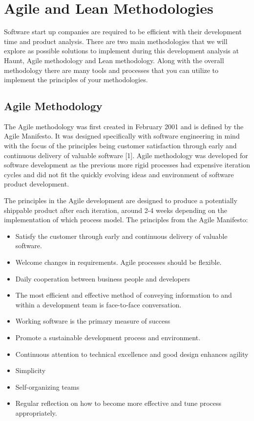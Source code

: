 \chapter{Agile and Lean Methodologies}

Software start up companies are required to be efficient with their development time and product analysis. There are two main methodologies that we will explore as possible solutions to implement during this development analysis at Haunt, Agile methodology and Lean methodology. Along with the overall methodology there are many tools and processes that you can utilize to implement the principles of your methodologies.

\section{Agile Methodology}
The Agile methodology was first created in February 2001 and is defined by the Agile Manifesto. It was designed specifically with software engineering in mind with the focus of the principles being customer satisfaction through early and continuous delivery of valuable software [1]. Agile methodology was developed for software development as the previous more rigid processes had expensive iteration cycles and did not fit the quickly evolving ideas and environment of software product development.

The principles in the Agile development are designed to produce a potentially shippable
product after each iteration, around 2-4 weeks depending on the implementation of which
process model. The principles from the Agile Manifesto:

\begin{itemize}
\item Satisfy the customer through early and continuous delivery of valuable software.
\item Welcome changes in requirements. Agile processes should be flexible.
\item Daily cooperation between business people and developers
\item The most efficient and effective method of conveying information to and within a development
team is face-to-face conversation.
\item Working software is the primary measure of success
\item Promote a sustainable development process and environment.
\item Continuous attention to technical excellence and good design enhances agility
\item Simplicity
\item Self-organizing teams
\item Regular reflection on how to become more effective and tune process appropriately.
\end{itemize}

